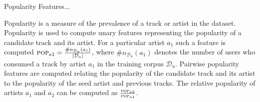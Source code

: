 Popularity Features...

Popularity is a measure of the prevalence of a track or artist in the dataset.
Popularity is used to compute unary features representing the popularity of a candidate track and its artist. For a particular artist $a_1$ such a feature is computed $\textsc{pop}_{a1}=\frac{\#n_{\mathcal{D}_u}\left(a_1\right)}{|\mathcal{D}_u|}$, where $\#n_{\mathcal{D}_u}\left(a_1\right)$ denotes the number of users who consumed a track by artist $a_1$  in the training corpus $\mathcal{D}_u$. Pairwise popularity features are computed relating the popularity of the candidate track and its artist to the popularity of the seed artist and previous tracks. The relative popularity of artists $a_1$ and $a_2$ can be computed as $\frac{\textsc{pop}_{a2}}{\textsc{pop}_{a1}}$.


 
 


